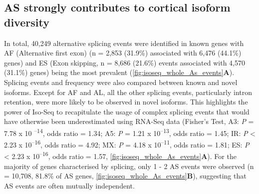 \subsection{AS strongly contributes to cortical isoform diversity}
\label{ch4_AS}
In total, 40,249 alternative splicing events were identified in known genes with AF (Alternative first exon) (n = 2,853 (31.9\%) associated with 6,476 (44.1\%) genes) and ES (Exon skipping, n = 8,686 (21.6\%) events associated with 4,570 (31.1\%) genes) being the most prevalent (\cref{fig:isoseq_whole_As_events}\textbf{A}). Splicing events and frequency were also compared between known and novel isoforms. Except for AF and AL, all the other splicing events, particularly intron retention, were more likely to be observed in novel isoforms. This highlights the power of Iso-Seq to recapitulate the usage of complex splicing events that would have otherwise been underestimated using RNA-Seq data (Fisher's Test, A3: \textit{P} = 7.78 x 10 \textsuperscript{–14}, odds ratio = 1.34; A5: \textit{P} = 1.21 x 10\textsuperscript{–13}, odds ratio = 1.45; IR: \textit{P} < 2.23 x 10\textsuperscript{–16}, odds ratio = 4.92; MX: \textit{P} = 4.18 x 10\textsuperscript{–11}, odds ratio = 1.81; ES: \textit{P} < 2.23 x 10\textsuperscript{–16}, odds ratio = 1.57, \cref{fig:isoseq_whole_As_events}\textbf{A}). For the majority of genes characterised by splicing, only 1 - 2 AS events were observed (n = 10,708, 81.8\% of AS genes, \cref{fig:isoseq_whole_As_events}\textbf{B}), suggesting that AS events are often mutually independent. 

